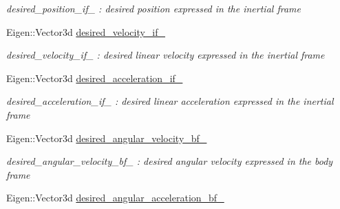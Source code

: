 \begin{DoxyCompactItemize}
\begin{DoxyCompactList}\small\item\em desired\-\_\-position\-\_\-if\-\_\- \-: desired position expressed in the inertial frame \end{DoxyCompactList}\item 
\hypertarget{class_skye_geometric_controller_a7a3a687ba05d79fe99b1c9b355d2c99d}{Eigen\-::\-Vector3d \hyperlink{class_skye_geometric_controller_a7a3a687ba05d79fe99b1c9b355d2c99d}{desired\-\_\-velocity\-\_\-if\-\_\-}}\label{class_skye_geometric_controller_a7a3a687ba05d79fe99b1c9b355d2c99d}

\begin{DoxyCompactList}\small\item\em desired\-\_\-velocity\-\_\-if\-\_\- \-: desired linear velocity expressed in the inertial frame \end{DoxyCompactList}\item 
\hypertarget{class_skye_geometric_controller_abaa48abd74ebc19730c665e769c7fd26}{Eigen\-::\-Vector3d \hyperlink{class_skye_geometric_controller_abaa48abd74ebc19730c665e769c7fd26}{desired\-\_\-acceleration\-\_\-if\-\_\-}}\label{class_skye_geometric_controller_abaa48abd74ebc19730c665e769c7fd26}

\begin{DoxyCompactList}\small\item\em desired\-\_\-acceleration\-\_\-if\-\_\- \-: desired linear acceleration expressed in the inertial frame \end{DoxyCompactList}\item 
\hypertarget{class_skye_geometric_controller_a2bf72b9a46d793c849ee8c5569eb8fd2}{Eigen\-::\-Vector3d \hyperlink{class_skye_geometric_controller_a2bf72b9a46d793c849ee8c5569eb8fd2}{desired\-\_\-angular\-\_\-velocity\-\_\-bf\-\_\-}}\label{class_skye_geometric_controller_a2bf72b9a46d793c849ee8c5569eb8fd2}

\begin{DoxyCompactList}\small\item\em desired\-\_\-angular\-\_\-velocity\-\_\-bf\-\_\- \-: desired angular velocity expressed in the body frame \end{DoxyCompactList}\item 
\hypertarget{class_skye_geometric_controller_a0d3d2af49252e08535ff312ed0c9b5ad}{Eigen\-::\-Vector3d \hyperlink{class_skye_geometric_controller_a0d3d2af49252e08535ff312ed0c9b5ad}{desired\-\_\-angular\-\_\-acceleration\-\_\-bf\-\_\-}}\label{class_skye_geometric_controller_a0d3d2af49252e08535ff312ed0c9b5ad}


\end{DoxyCompactItemize}
